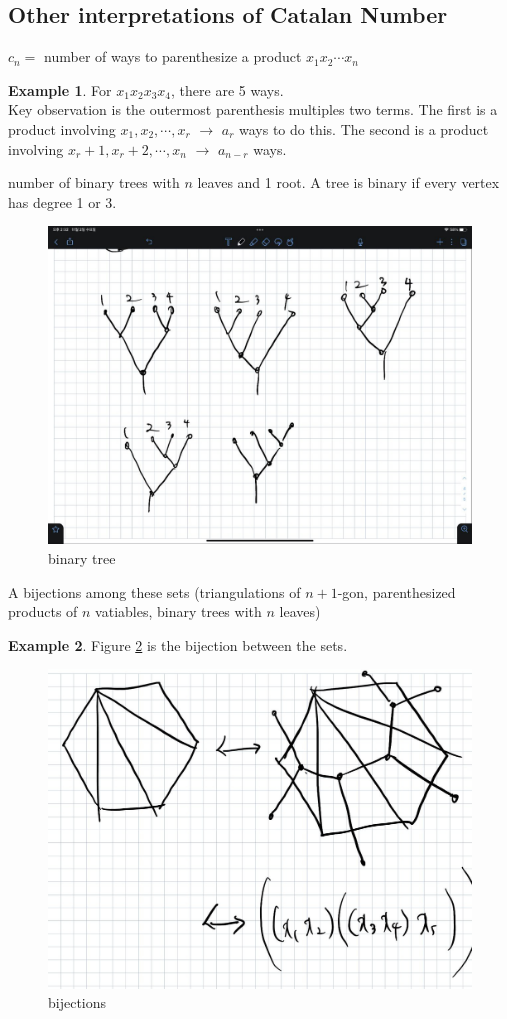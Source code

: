 \documentclass{article}
\theoremstyle{definition}
\newtheorem{ex}{Example}[]
\begin{document}
\subsection{Other interpretations of Catalan Number}
$c_n =$ number of ways to parenthesize a product $x_1 x_2 \cdots x_n$  
\begin{ex}
    For $x_1 x_2 x_3 x_4$, there are 5 ways. \\ 
    Key observation is the outermost parenthesis multiples two terms.
    The first is a product involving $x_1, x_2, \cdots , x_r$ $\rightarrow$ $a_r$ 
    ways to do this. The second is a product involving $x_r+1, x_r+2, \cdots, x_n$ $\rightarrow$
    $a_{n-r}$ ways.
\end{ex}
number of binary trees with $n$ leaves and 1 root. A tree is binary if 
every vertex has degree 1 or 3. \\ 
\begin{figure}[!h]
    \centerline{\includegraphics[width=0.5\columnwidth]{tree.jpg}}
    \caption{binary tree}
    \label{tree} 
\end{figure}
A bijections among these sets (triangulations of $n+1$-gon, parenthesized products
of $n$ vatiables, binary trees with $n$ leaves)
\begin{ex}
    Figure \ref{figure_1} is the bijection between the sets.
    \begin{figure}[!h]
        \centerline{\includegraphics[width=0.5\columnwidth]{bijection_gon.jpg}}
        \caption{bijections}
        \label{figure_1} 
    \end{figure}
\end{ex}
\end{document}
